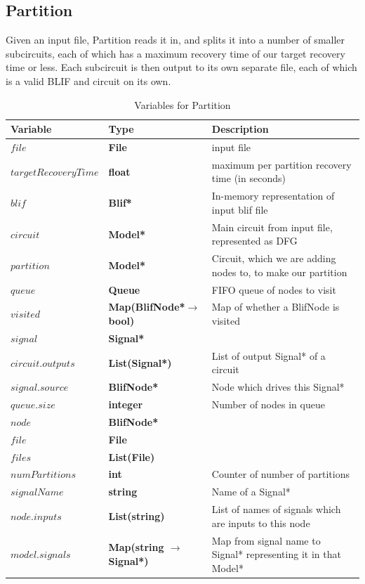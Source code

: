 \documentclass[12pt,final,oneside]{article} %
\begin{document}
\newpage
\subsection{Partition}
Given an input file, Partition reads it in, and splits it into a number of smaller subcircuits, each of which has a maximum recovery time of our target recovery time or less. Each subcircuit is then output to its own separate file, each of which is a valid \ac{BLIF} and circuit on its own.
\begin{table}
    \begin{center}
        \begin{tabularx}{\linewidth}{llX}
        \toprule
        Variable & Type & Description\\
        \midrule
        $file$ &\bf File  & input file\\
        $targetRecoveryTime$ &\bf  float & maximum per partition recovery time (in seconds)\\
        $blif$ &\bf  Blif* & In-memory representation of input blif file\\
        $circuit$ &\bf   Model* & Main circuit from input file, represented as DFG\\
        $partition$ &\bf   Model* & Circuit, which we are adding nodes to, to make our partition\\
        $queue$ &\bf  Queue & FIFO queue of nodes to visit\\
        $visited$ &\bf   Map(BlifNode*$\to$ bool)& Map of whether a BlifNode is visited\\
        $signal$ &\bf  Signal* & \\
        $circuit.outputs$ &\bf  List(Signal*) & List of output Signal* of a circuit\\
        $signal.source$ &\bf  BlifNode* & Node which drives this Signal*\\
        $queue.size$ &\bf  integer & Number of nodes in queue\\
        $node$ &\bf  BlifNode* & \\
        $file$ &\bf  File & \\
        $files$ &\bf  List(File) & \\
        $numPartitions$ &\bf  int & Counter of number of partitions\\
        $signalName$ &\bf  string & Name of a Signal*\\
        $node.inputs$ &\bf  List(string) & List of names of signals which are inputs to this node\\
        $model.signals$ &\bf  Map(string $\to$ Signal*) & Map from signal name to Signal* representing it in that Model*\\
        \bottomrule
        \end{tabularx}
        \caption{Variables for Partition}
        \label{varPart}
    \end{center}
\end{table}
\end{document}
